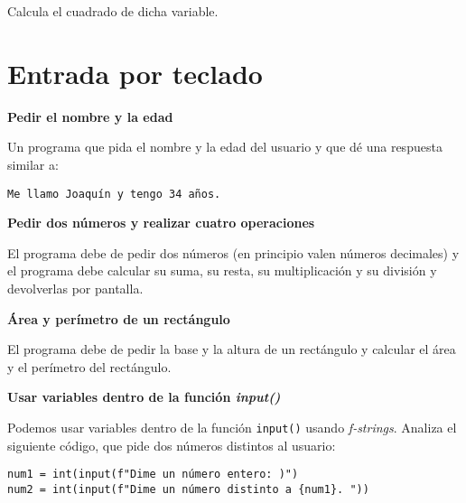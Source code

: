 \documentclass[a4paper, 11pt]{scrartcl}
\newenvironment{code}{\begin{tcolorbox}[colback=red!2!white]}{\end{tcolorbox}}
\begin{document}
Calcula el cuadrado de dicha variable.


\newpage

\section{Entrada por teclado}





\noindent\textbf{\sffamily  Pedir el nombre y la edad}

Un programa que pida el nombre y la edad del usuario y que dé una respuesta similar a:

\smallskip

\begin{code}

\begin{verbatim}
Me llamo Joaquín y tengo 34 años.
\end{verbatim}

\end{code}





\noindent\textbf{\sffamily Pedir dos números y realizar cuatro operaciones}

El programa debe de pedir dos números (en principio valen números decimales) y el programa debe calcular su suma, su resta, su multiplicación y su división y devolverlas por pantalla.






\noindent\textbf{\sffamily Área  y perímetro de un rectángulo}

El programa debe de pedir la base y la altura de un rectángulo y calcular el área y el perímetro del rectángulo.






\noindent\textbf{\sffamily Usar variables dentro de la función \textit{input()}}

Podemos usar variables dentro de la función \verb|input()| usando \textit{f-strings}. Analiza el siguiente código, que pide dos números distintos al usuario:

\smallskip

\begin{code}

\begin{verbatim}
num1 = int(input(f"Dime un número entero: )")
num2 = int(input(f"Dime un número distinto a {num1}. "))
\end{verbatim}

\end{code}
\end{document}
